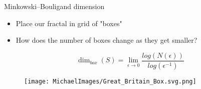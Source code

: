 	\begin{frame}{ Minkowski–Bouligand dimension}
	\begin{itemize}
		\item Place our fractal in grid of "boxes"
		\item How does the number of boxes change as they get smaller?
	\end{itemize}
	
	\begin{center}
		\[\dim_{box}(S) = \lim_{\epsilon \to 0}\frac{log (N(\epsilon))}{log(\epsilon^{-1})}\] 
	\end{center}
	\begin{figure}
		\centering
		\texttt{[image: MichaelImages/Great\_Britain\_Box.svg.png]}
		\caption{\cite{555w}}
		\label{fig:enter-label}
	\end{figure}
	\end{frame}
